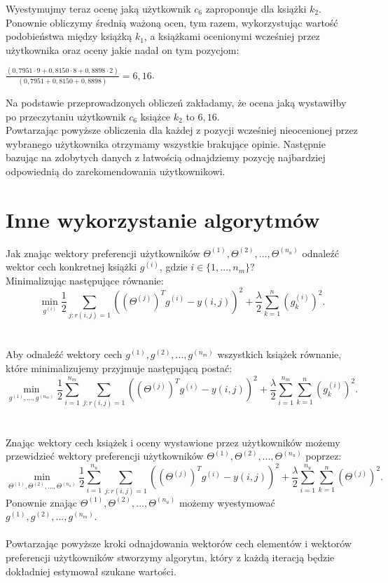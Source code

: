\documentclass[12pt,a4paper]{report}
\begin{document}
Wyestymujmy teraz ocenę jaką użytkownik $c_6$ zaproponuje dla książki $k_2$. Ponownie obliczymy średnią ważoną ocen, tym razem, wykorzystując wartość podobieństwa między książką $k_1$, a książkami ocenionymi wcześniej przez użytkownika oraz oceny jakie nadał on tym pozycjom:
\begin{center}
$\frac{(0,7951 \cdot 9 + 0,8150 \cdot 8 + 0,8898 \cdot 2)}{(0,7951 + 0,8150 + 0,8898)} = 6,16 $.
\end{center}
Na podstawie przeprowadzonych obliczeń zakładamy, że ocena jaką wystawiłby po przeczytaniu użytkownik $c_6$ książce $k_2$ to $6,16$.
\\Powtarzając powyższe obliczenia dla każdej z pozycji wcześniej nieocenionej przez wybranego użytkownika otrzymamy wszystkie brakujące opinie. Następnie bazując na zdobytych danych z łatwością odnajdziemy pozycję najbardziej odpowiednią do zarekomendowania użytkownikowi.

\section{Inne wykorzystanie algorytmów}
Jak znając wektory preferencji użytkowników $\Theta^{(1)}, \Theta^{(2)},...,\Theta^{(n_u)}$ odnaleźć wektor cech konkretnej książki $g^{(i)}$, gdzie $i \in \{1,...,n_m\}$?
\\Minimalizując następujące równanie:
$$\min \limits_{g^{(i)}} \frac{1}{2} \sum_{j:r(i,j)=1} ((\Theta^{(j)})^T g^{(i)} - y(i,j))^2 + \frac{\lambda}{2} \sum_{k=1}^n (g_k^{(i)})^2.$$
\\
\\Aby odnaleźć wektory cech $g^{(1)}, g^{(2)},...,g^{(n_m)}$ wszystkich książek równanie, które minimalizujemy przyjmuje następującą postać:
$$\min \limits_{g^{(1)},...,g^{(n_m)}} \frac{1}{2} \sum_{i=1}^{n_m} \sum_{j:r(i,j)=1} ((\Theta^{(j)})^T g^{(i)} - y(i,j))^2 + \frac{\lambda}{2} \sum_{i=1}^{n_m} \sum_{k=1}^n (g_k^{(i)})^2.$$
\\
\\Znając wektory cech książek i oceny wystawione przez użytkowników możemy przewidzieć wektory preferencji użytkowników $\Theta^{(1)}, \Theta^{(2)},...,\Theta^{(n_u)}$ poprzez:
$$\min \limits_{\Theta^{(1)}, \Theta^{(2)},...,\Theta^{(n_u)}} \frac{1}{2} \sum_{i=1}^{n_u} \sum_{j:r(i,j)=1} ((\Theta^{(j)})^T g^{(i)} - y(i,j))^2 + \frac{\lambda}{2} \sum_{i=1}^{n_u} \sum_{k=1}^n (\Theta^{(j)})^2.$$
Ponownie znając $\Theta^{(1)}, \Theta^{(2)},...,\Theta^{(n_u)}$ możemy wyestymować $g^{(1)}, g^{(2)},...,g^{(n_m)}$.
\\
\\Powtarzając powyższe kroki odnajdowania wektorów cech elementów i wektorów preferencji użytkowników stworzymy algorytm, który z każdą iteracją będzie dokładniej estymował szukane wartości.
\end{document}
